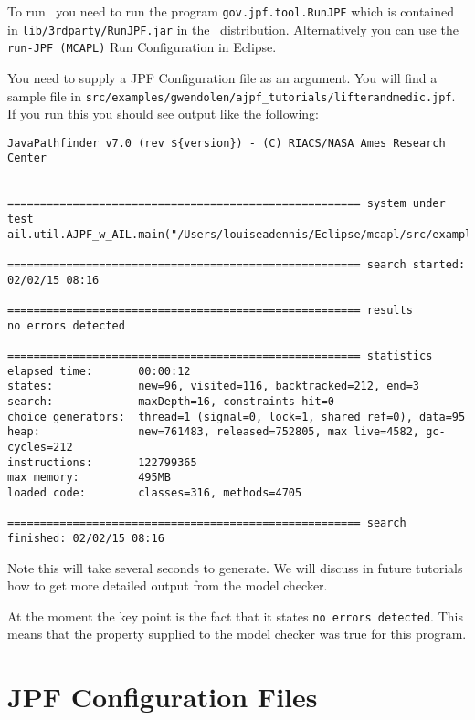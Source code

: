 To run \ajpf\ you need to run the program \texttt{gov.jpf.tool.RunJPF} which is contained in \texttt{lib/3rdparty/RunJPF.jar} in the \mcapl\ distribution.  Alternatively you can use the \texttt{run-JPF (MCAPL)} Run Configuration in Eclipse.

You need to supply a JPF Configuration file as an argument.  You will find a sample file in \texttt{src/examples/gwendolen/ajpf\_tutorials/lifterandmedic.jpf}.  If you run this you should see output like the following:

\begin{verbatim}
JavaPathfinder v7.0 (rev ${version}) - (C) RIACS/NASA Ames Research Center


====================================================== system under test
ail.util.AJPF_w_AIL.main("/Users/louiseadennis/Eclipse/mcapl/src/examples/gwendolen/ail_tutorials/tutorial1/answers/ex2.ail","/Users/louiseadennis/Eclipse/mcapl/src/examples/gwendolen/ajpf_tutorials/tutorial1/lifterandmedic.psl","1")

====================================================== search started: 02/02/15 08:16

====================================================== results
no errors detected

====================================================== statistics
elapsed time:       00:00:12
states:             new=96, visited=116, backtracked=212, end=3
search:             maxDepth=16, constraints hit=0
choice generators:  thread=1 (signal=0, lock=1, shared ref=0), data=95
heap:               new=761483, released=752805, max live=4582, gc-cycles=212
instructions:       122799365
max memory:         495MB
loaded code:        classes=316, methods=4705

====================================================== search finished: 02/02/15 08:16
\end{verbatim}

Note this will take several seconds to generate.  We will discuss in future tutorials how to get more detailed output from the model checker.

At the moment the key point is the fact that it states \texttt{no errors detected}.  This means that the property supplied to the model checker was true for this program.

\section{JPF Configuration Files}

